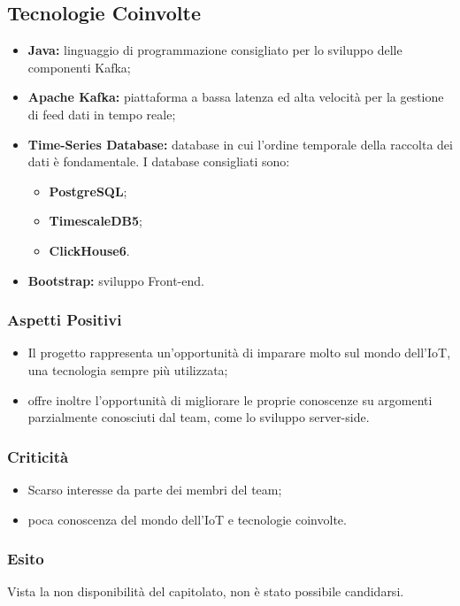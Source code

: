	\subsection{Tecnologie Coinvolte}
	\begin{itemize}
		\item \textbf{Java}\textbf{:} linguaggio di programmazione consigliato per lo sviluppo delle componenti Kafka; 
		\item \textbf{Apache Kafka}\textbf{:} piattaforma a bassa latenza ed alta velocità per la gestione di feed dati in tempo reale; 
		\item \textbf{Time-Series Database:} database in cui l'ordine temporale della raccolta dei dati è fondamentale. I database consigliati sono:
			\begin{itemize}
			\item \textbf{PostgreSQL}; 
			\item \textbf{TimescaleDB5};
			\item \textbf{ClickHouse6}.
			\end{itemize}
		\item \textbf{Bootstrap}\textbf{:} sviluppo Front-end.
	\end{itemize}
	\subsubsection{Aspetti Positivi}
		\begin{itemize}
			\item Il progetto rappresenta un'opportunità di imparare molto sul mondo dell'IoT, una tecnologia sempre più utilizzata; 
			\item offre inoltre l'opportunità di migliorare le proprie conoscenze su argomenti parzialmente conosciuti dal team, come lo sviluppo server-side.
		\end{itemize} 
	\subsubsection{Criticità}
		\begin{itemize}
			\item Scarso interesse da parte dei membri del team; 
			\item poca conoscenza del mondo dell'IoT e tecnologie coinvolte.
		\end{itemize}
	\subsubsection{Esito}
	Vista la non disponibilità del capitolato, non è stato possibile candidarsi.
		
		